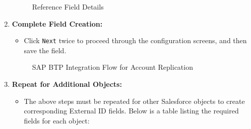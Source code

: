 \begin{enumerate}
    \begin{figure}[H]
    \centering
    \caption{Reference Field Details}
    
    \end{figure}
    

    \item \textbf{Complete Field Creation:}
    \begin{itemize}
        \item Click \texttt{Next} twice to proceed through the configuration screens, and then save the field.
    \end{itemize}

    \begin{figure}[H]
    \centering
    \caption{SAP BTP Integration Flow for Account Replication}
    
    \end{figure}

    \item \textbf{Repeat for Additional Objects:}
    \begin{itemize}
        \item The above steps must be repeated for other Salesforce objects to create corresponding External ID fields. Below is a table listing the required fields for each object:
    \end{itemize}
\end{enumerate}

